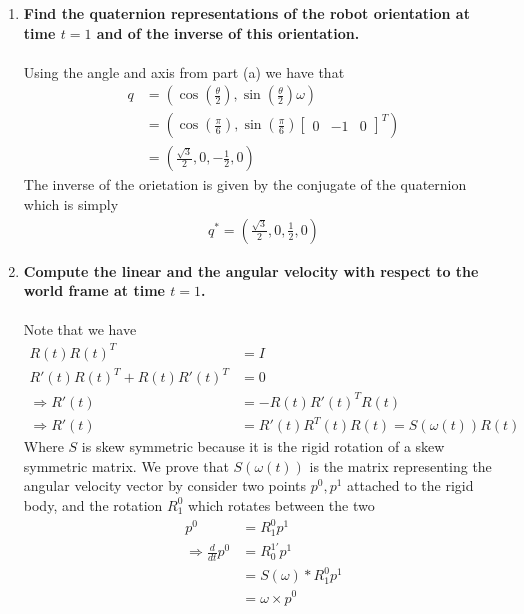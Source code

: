 \documentclass{article}
\begin{document}
\begin{enumerate}
\begin{enumerate}
      \item \textbf{Find the quaternion representations of the robot orientation at time $t=1$ and of the inverse of this orientation.} \\\\
      Using the angle and axis from part (a) we have that
      \begin{align*}
       q &= \left( \cos\left(\frac{\theta}{2}\right), \sin\left(\frac{\theta}{2}\right) \omega \right)
       \\
       &= \left( \cos\left(\frac{\pi}{6}\right), \sin\left(\frac{\pi}{6}\right) \begin{bmatrix}
       0 & -1 & 0
       \end{bmatrix}^T\right)
       \\
      &= \left( \frac{\sqrt{3}}{2}, 0 , -\frac{1}{2}, 0 \right)
      \end{align*}
      The inverse of the orietation is given by the conjugate of the quaternion which is simply
      \begin{align*}
       q^* = \left( \frac{\sqrt{3}}{2}, 0 , \frac{1}{2}, 0 \right)
      \end{align*}


      \item \textbf{Compute the linear and the angular velocity with respect to the world frame at time $t = 1$.} \\\\
   
      Note that we have 
      \begin{align*}
       R(t)R(t)^T &= I \\
       R'(t)R(t)^T +R(t)R'(t)^T &= 0
       \\
       \Rightarrow
       R'(t) &= -R(t)R'(t)^TR(t)
       \\
       \Rightarrow R'(t) &= R'(t)R^T(t) R(t) = S(\omega(t)) R(t)
      \end{align*}
      Where $S$ is skew symmetric because it is the rigid rotation of a skew symmetric matrix. We prove that $S(\omega(t))$ is the matrix representing the angular velocity vector by consider two points $p^0, p^1$ attached to the rigid body, and the rotation $R^0_1$ which rotates between the two
      \begin{align*}
       p^0 &= R_1^0p^1\\
       \Rightarrow \frac{d}{dt} p^0 &= R_0^{1'} p^1
       \\
       &=S(\omega)*R_1^0 p^1
       \\
       &= \omega \times p^0
      \end{align*}
   

\end{enumerate}
\end{enumerate}
\end{document}
